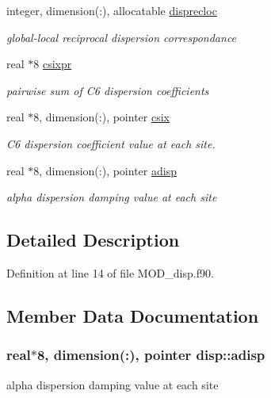 \begin{DoxyCompactItemize}
integer, dimension(\-:), allocatable \hyperlink{classdisp_a0866d52611a6e50459bf96953cc78fb4}{disprecloc}
\begin{DoxyCompactList}\small\item\em global-\/local reciprocal dispersion correspondance \end{DoxyCompactList}\item 
real $\ast$8 \hyperlink{classdisp_a5f79cf27d59c5a6b9f791a5e12e3e9d8}{csixpr}
\begin{DoxyCompactList}\small\item\em pairwise sum of C6 dispersion coefficients \end{DoxyCompactList}\item 
real $\ast$8, dimension(\-:), pointer \hyperlink{classdisp_aa5d199a19305f4f88c604197115716cc}{csix}
\begin{DoxyCompactList}\small\item\em C6 dispersion coefficient value at each site. \end{DoxyCompactList}\item 
real $\ast$8, dimension(\-:), pointer \hyperlink{classdisp_a00becba43be1b805d2b819b787fd256b}{adisp}
\begin{DoxyCompactList}\small\item\em alpha dispersion damping value at each site \end{DoxyCompactList}\end{DoxyCompactItemize}


\subsection{Detailed Description}


Definition at line 14 of file M\-O\-D\-\_\-disp.\-f90.



\subsection{Member Data Documentation}
\hypertarget{classdisp_a00becba43be1b805d2b819b787fd256b}{
\subsubsection[{adisp}]{\setlength{\rightskip}{0pt plus 5cm}real$\ast$8, dimension(\-:), pointer disp\-::adisp}}\label{classdisp_a00becba43be1b805d2b819b787fd256b}


alpha dispersion damping value at each site 



